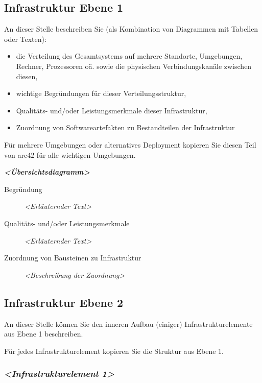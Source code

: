 \documentclass[]{article}
\begin{document}
\subsection{Infrastruktur Ebene 1}\label{_infrastruktur_ebene_1}

An dieser Stelle beschreiben Sie (als Kombination von Diagrammen mit
Tabellen oder Texten):

\begin{itemize}
\item
  die Verteilung des Gesamtsystems auf mehrere Standorte, Umgebungen,
  Rechner, Prozessoren oä. sowie die physischen Verbindungskanäle
  zwischen diesen,
\item
  wichtige Begründungen für dieser Verteilungsstruktur,
\item
  Qualitäts- und/oder Leistungsmerkmale dieser Infrastruktur,
\item
  Zuordnung von Softwareartefakten zu Bestandteilen der Infrastruktur
\end{itemize}

Für mehrere Umgebungen oder alternatives Deployment kopieren Sie diesen
Teil von arc42 für alle wichtigen Umgebungen.

\emph{\textbf{\textless{}Übersichtsdiagramm\textgreater{}}}

\begin{description}
\item[Begründung]
\emph{\textless{}Erläuternder Text\textgreater{}}
\item[Qualitäts- und/oder Leistungsmerkmale]
\emph{\textless{}Erläuternder Text\textgreater{}}
\item[Zuordnung von Bausteinen zu Infrastruktur]
\emph{\textless{}Beschreibung der Zuordnung\textgreater{}}
\end{description}

\subsection{Infrastruktur Ebene 2}\label{_infrastruktur_ebene_2}

An dieser Stelle können Sie den inneren Aufbau (einiger)
Infrastrukturelemente aus Ebene 1 beschreiben.

Für jedes Infrastrukturelement kopieren Sie die Struktur aus Ebene 1.

\subsubsection{\texorpdfstring{\emph{\textless{}Infrastrukturelement
1\textgreater{}}}{\textless{}Infrastrukturelement 1\textgreater{}}}\label{__emphasis_infrastrukturelement_1_emphasis}
\end{document}

